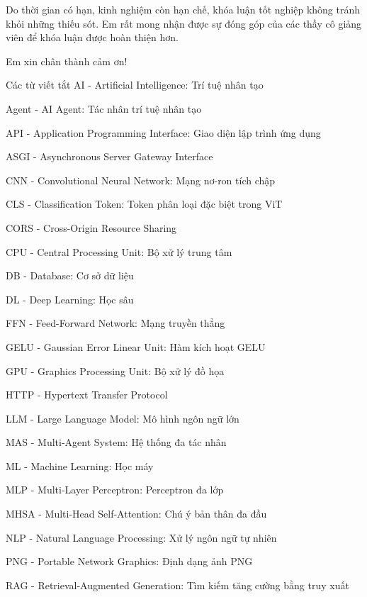 \documentclass{uetgraduation}
\begin{document}
Do thời gian có hạn, kinh nghiệm còn hạn chế, khóa luận tốt nghiệp không tránh khỏi những thiếu sót. Em rất mong nhận được sự đóng góp của các thầy cô giảng viên để khóa luận được hoàn thiện hơn.

Em xin chân thành cảm ơn!

\clearpage

\begin{contentlisting}

\tableofcontents

\listoffigures
\listoftables

\begin{contentlistingsection}{Các từ viết tắt}
AI - Artificial Intelligence: Trí tuệ nhân tạo

Agent - AI Agent: Tác nhân trí tuệ nhân tạo

API - Application Programming Interface: Giao diện lập trình ứng dụng

ASGI - Asynchronous Server Gateway Interface

CNN - Convolutional Neural Network: Mạng nơ-ron tích chập

CLS - Classification Token: Token phân loại đặc biệt trong ViT

CORS - Cross-Origin Resource Sharing

CPU - Central Processing Unit: Bộ xử lý trung tâm

DB - Database: Cơ sở dữ liệu

DL - Deep Learning: Học sâu

FFN - Feed-Forward Network: Mạng truyền thẳng

GELU - Gaussian Error Linear Unit: Hàm kích hoạt GELU

GPU - Graphics Processing Unit: Bộ xử lý đồ họa

HTTP - Hypertext Transfer Protocol

LLM - Large Language Model: Mô hình ngôn ngữ lớn

MAS - Multi-Agent System: Hệ thống đa tác nhân

ML - Machine Learning: Học máy

MLP - Multi-Layer Perceptron: Perceptron đa lớp

MHSA - Multi-Head Self-Attention: Chú ý bản thân đa đầu

NLP - Natural Language Processing: Xử lý ngôn ngữ tự nhiên

PNG - Portable Network Graphics: Định dạng ảnh PNG

RAG - Retrieval-Augmented Generation: Tìm kiếm tăng cường bằng truy xuất


\end{contentlistingsection}
\end{contentlisting}
\end{document}
